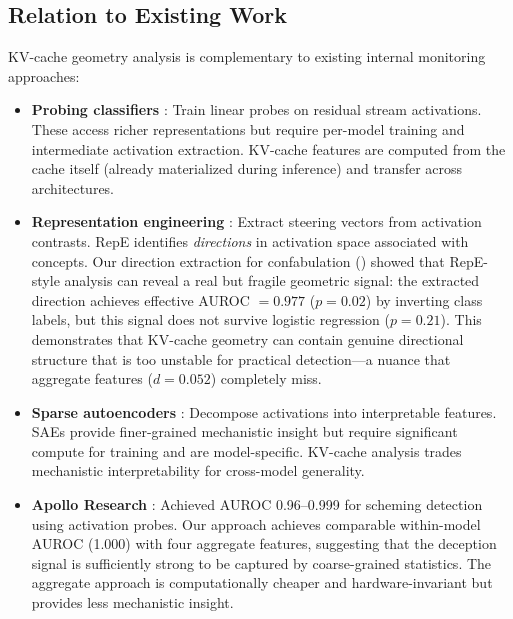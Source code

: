 \subsection{Relation to Existing Work}

KV-cache geometry analysis is complementary to existing internal monitoring approaches:

\begin{itemize}[leftmargin=*]
    \item \textbf{Probing classifiers} \citep{burns2023discovering,li2024inference}: Train linear probes on residual stream activations. These access richer representations but require per-model training and intermediate activation extraction. KV-cache features are computed from the cache itself (already materialized during inference) and transfer across architectures.

    \item \textbf{Representation engineering} \citep{zou2023representation}: Extract steering vectors from activation contrasts. RepE identifies \emph{directions} in activation space associated with concepts. Our direction extraction for confabulation () showed that RepE-style analysis can reveal a real but fragile geometric signal: the extracted direction achieves effective AUROC $= 0.977$ ($p = 0.02$) by inverting class labels, but this signal does not survive logistic regression ($p = 0.21$). This demonstrates that KV-cache geometry can contain genuine directional structure that is too unstable for practical detection---a nuance that aggregate features ($d = 0.052$) completely miss.

    \item \textbf{Sparse autoencoders} \citep{bricken2023monosemanticity,cunningham2024sparse}: Decompose activations into interpretable features. SAEs provide finer-grained mechanistic insight but require significant compute for training and are model-specific. KV-cache analysis trades mechanistic interpretability for cross-model generality.

    \item \textbf{Apollo Research} \citep{apollo2024}: Achieved AUROC 0.96--0.999 for scheming detection using activation probes. Our approach achieves comparable within-model AUROC (1.000) with four aggregate features, suggesting that the deception signal is sufficiently strong to be captured by coarse-grained statistics. The aggregate approach is computationally cheaper and hardware-invariant but provides less mechanistic insight.
\end{itemize}

